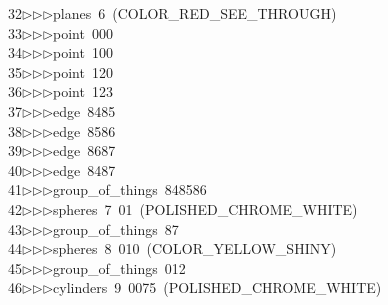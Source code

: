 \begin{tabbing}
32\>$\triangleright$\>$\triangleright$\>$\triangleright$\>planes\ 6\ (COLOR\_RED\_SEE\_THROUGH)\ \\[0pt]
33\>$\triangleright$\>$\triangleright$\>$\triangleright$\>point\ 000\ \\[0pt]
34\>$\triangleright$\>$\triangleright$\>$\triangleright$\>point\ 100\ \\[0pt]
35\>$\triangleright$\>$\triangleright$\>$\triangleright$\>point\ 120\ \\[0pt]
36\>$\triangleright$\>$\triangleright$\>$\triangleright$\>point\ 123\ \\[0pt]
37\>$\triangleright$\>$\triangleright$\>$\triangleright$\>edge\ 8485\ \\[0pt]
38\>$\triangleright$\>$\triangleright$\>$\triangleright$\>edge\ 8586\ \\[0pt]
39\>$\triangleright$\>$\triangleright$\>$\triangleright$\>edge\ 8687\ \\[0pt]
40\>$\triangleright$\>$\triangleright$\>$\triangleright$\>edge\ 8487\ \\[0pt]
41\>$\triangleright$\>$\triangleright$\>$\triangleright$\>group\_of\_things\ 848586\ \\[0pt]
42\>$\triangleright$\>$\triangleright$\>$\triangleright$\>spheres\ 7\ 01\ (POLISHED\_CHROME\_WHITE)\ \\[0pt]
43\>$\triangleright$\>$\triangleright$\>$\triangleright$\>group\_of\_things\ 87\ \\[0pt]
44\>$\triangleright$\>$\triangleright$\>$\triangleright$\>spheres\ 8\ 010\ (COLOR\_YELLOW\_SHINY)\ \\[0pt]
45\>$\triangleright$\>$\triangleright$\>$\triangleright$\>group\_of\_things\ 012\ \\[0pt]
46\>$\triangleright$\>$\triangleright$\>$\triangleright$\>cylinders\ 9\ 0075\ (POLISHED\_CHROME\_WHITE)\ \\[0pt]

\end{tabbing}
